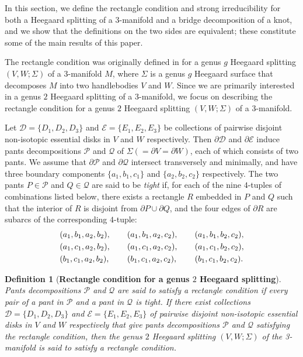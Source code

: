 \documentclass[12pt]{amsart}
\newtheorem{Def}[theorem]{Definition}
\begin{document}
In this section, we define the rectangle condition and strong irreducibility for both a Heegaard splitting of a 3-manifold
and a bridge decomposition of a knot, and we show that the definitions on the two sides are equivalent; these constitute some of the main results of this paper.


The rectangle condition was originally defined in \cite{CG} for a genus $g$ Heegaard splitting $(V, W; \Sigma)$ of a
3-manifold $M$, where $\Sigma$ is a genus $g$ Heegaard surface that decomposes $M$ into two handlebodies $V$ and $W$.
Since we are primarily interested in a genus $2$ Heegaard splitting of a 3-manifold, we focus on describing the rectangle condition
for a genus $2$ Heegaard splitting $(V, W; \Sigma)$ of a 3-manifold.

Let $\mathcal{D}=\{D_1, D_2, D_3\}$ and $\mathcal{E}=\{E_1, E_2, E_3\}$ be collections of pairwise disjoint non-isotopic essential disks in $V$
and $W$ respectively. Then $\partial\mathcal{D}$ and $\partial\mathcal{E}$ induce pants decompositions $\mathcal{P}$ and $\mathcal{Q}$ of $\Sigma(=\partial V=\partial W)$,
each of which consists of two pants. We assume that $\partial\mathcal{P}$ and $\partial\mathcal{Q}$ intersect transversely and minimally,
and have three boundary components $\{a_1,b_1,c_1\}$ and $\{a_2,b_2,c_2\}$ respectively.
The two pants $P\in\mathcal{P}$ and $Q\in\mathcal{Q}$ are said to be \textit{tight} if, for each of the nine $4$-tuples of combinations listed below, there exists a rectangle $R$ embedded in $P$ and $Q$ such that the interior of $R$ is disjoint from $\partial P\cup \partial Q$, and the four edges of $\partial R$ are subarcs of the corresponding $4$-tuple:
\[
\begin{split}
&(a_1,b_1,a_2,b_2),\hskip 20pt (a_1,b_1,a_2,c_2),\hskip 20pt (a_1,b_1,b_2,c_2),\\
&(a_1,c_1,a_2,b_2),\hskip 20pt (a_1,c_1,a_2,c_2),\hskip 20pt (a_1,c_1,b_2,c_2),\\
&(b_1,c_1,a_2,b_2),\hskip 21pt (b_1,c_1,a_2,c_2),\hskip 21pt (b_1,c_1,b_2,c_2).
\end{split}
\]
\vskip 4pt


\begin{Def}[\textbf{Rectangle condition for a genus $2$ Heegaard splitting}] \label{Rectangle condition for Heegaard splitting}
Pants decompositions $\mathcal{P}$ and $\mathcal{Q}$ are said to satisfy a rectangle condition if every pair of a pant in $\mathcal{P}$ and a pant in $\mathcal{Q}$ is tight.
If there exist collections $\mathcal{D}=\{D_1, D_2, D_3\}$ and $\mathcal{E}=\{E_1, E_2, E_3\}$ of pairwise disjoint non-isotopic essential disks in $V$
and $W$ respectively that give pants decompositions $\mathcal{P}$ and $\mathcal{Q}$ satisfying the rectangle condition,
then the genus $2$ Heegaard splitting $(V, W; \Sigma)$ of the 3-manifold is said to satisfy a rectangle condition.
\end{Def}
\end{document}
